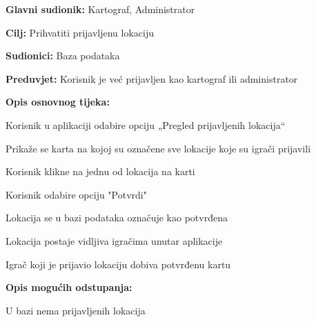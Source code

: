\noindent {}
\begin{packed_item}
	
	\item \textbf{Glavni sudionik: }Kartograf, Administrator
	\item  \textbf{Cilj:} Prihvatiti prijavljenu lokaciju
	\item  \textbf{Sudionici:} Baza podataka
	\item  \textbf{Preduvjet:} Korisnik je već prijavljen kao kartograf ili administrator
	\item  \textbf{Opis osnovnog tijeka:}
	
	\item[] \begin{packed_enum}
		
		\item Korisnik u aplikaciji odabire opciju „Pregled prijavljenih lokacija“
		\item Prikaže se karta na kojoj su označene sve lokacije koje su igrači prijavili
		\item Korisnik klikne na jednu od lokacija na karti
		\item Korisnik odabire opciju "Potvrdi"
		\item Lokacija se u bazi podataka označuje kao potvrđena
		\item Lokacija postaje vidljiva igračima unutar aplikacije
		\item Igrač koji je prijavio lokaciju dobiva potvrđenu kartu
	\end{packed_enum}
	
	\item  \textbf{Opis mogućih odstupanja:}
	
	\item[] \begin{packed_item}
		
		\item[3.a]  U bazi nema prijavljenih lokacija
		
	\end{packed_item}
\end{packed_item}

